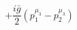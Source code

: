 %
\begin{dmath*}
%
  +  \frac{i {\bar g}{}}{2} \left(p_1^{\mu_3} - p_2^{\mu_3}\right)
%
\end{dmath*}
%
